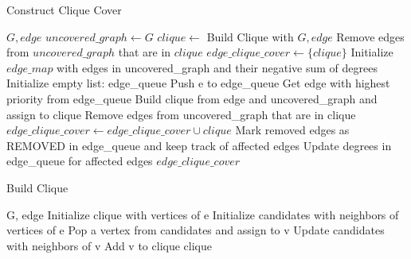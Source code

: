 \begin{algorithm}
\caption{Construct Clique Cover}
\begin{algorithmic}[1]
\REQUIRE $G, edge$
\STATE $uncovered\_graph\gets G$
\STATE $clique\gets$ Build Clique with $G, edge$
\STATE Remove edges from $uncovered\_graph$ that are in $clique$
\STATE $edge\_clique\_cover\gets \{clique\}$
\STATE Initialize $edge\_map$ with edges in uncovered\_graph and their negative sum of degrees
\STATE Initialize empty list: edge\_queue
    \STATE Push e to edge\_queue
\ENDFOR
{}
    \STATE Get edge with highest priority from edge\_queue
    \STATE Build clique from edge and uncovered\_graph and assign to clique
    \STATE Remove edges from uncovered\_graph that are in clique
    \STATE $edge\_clique\_cover\gets edge\_clique\_cover\cup {clique}$
    \STATE Mark removed edges as REMOVED in edge\_queue and keep track of affected edges
    \STATE Update degrees in edge\_queue for affected edges
\ENDWHILE
\RETURN $edge\_clique\_cover$
\end{algorithmic}
\end{algorithm}

\begin{algorithm}
\caption{Build Clique}
\begin{algorithmic}[1]
\REQUIRE G, edge
\STATE Initialize clique with vertices of e
\STATE Initialize candidates with neighbors of vertices of e
    \STATE Pop a vertex from candidates and assign to v
        \STATE Update candidates with neighbors of v
        \STATE Add v to clique
    \ENDIF
\ENDWHILE
\RETURN clique
\end{algorithmic}
\end{algorithm}

